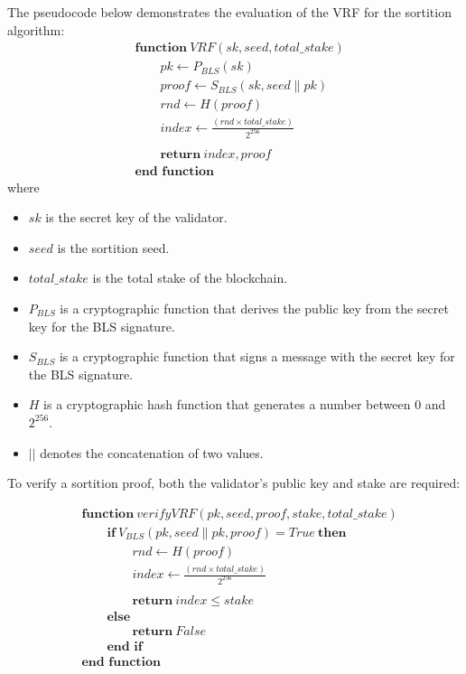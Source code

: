 \documentclass{novel}
\begin{document}
The pseudocode below demonstrates the evaluation of the VRF for the sortition algorithm:
\begin{align*}
& \textbf{function} \ VRF(sk, seed, total\_stake) \\
& \qquad pk \gets P_{BLS}(sk) \\
& \qquad proof \gets S_{BLS}(sk, seed \| pk) \\
& \qquad rnd \gets H(proof) \\
& \qquad index \gets \frac{(rnd \times total\_stake)}{2^{256}} \\
& \qquad \\
& \qquad \textbf{return} \ index, proof \\
& \textbf{end function}
\end{align*}
where
\begin{itemize}
  \item $sk$ is the secret key of the validator.
  \item $seed$ is the sortition seed.
  \item $total\_stake$ is the total stake of the blockchain.
  \item $P_{BLS}$ is a cryptographic function that derives the public key from the secret key for the BLS signature.
  \item $S_{BLS}$  is a cryptographic function that signs a message with the secret key for the BLS signature.
  \item $H$ is a cryptographic hash function that generates a number between $0$ and $2 ^{256}$.
  \item $||$ denotes the concatenation of two values.
\end{itemize}
To verify a sortition proof, both the validator’s public key and stake are required:

  \begin{align*}
    & \textbf{function} \ verifyVRF(pk, seed, proof, stake, total\_stake) \\
    & \qquad \textbf{if} \ V_{BLS}(pk, seed \| pk, proof) = True \ \textbf{then} \\
    & \qquad \qquad rnd \gets H(proof) \\
    & \qquad \qquad index \gets \frac{(rnd \times total\_stake)}{2^{256}} \\
    & \qquad \\
    & \qquad  \qquad \textbf{return} \ index \leqslant stake \\
    & \qquad  \textbf{else} \\
    & \qquad  \qquad \textbf{return} \ False \\
    & \qquad  \textbf{end if} \\
    & \textbf{end function}
\end{align*}
\end{document}
